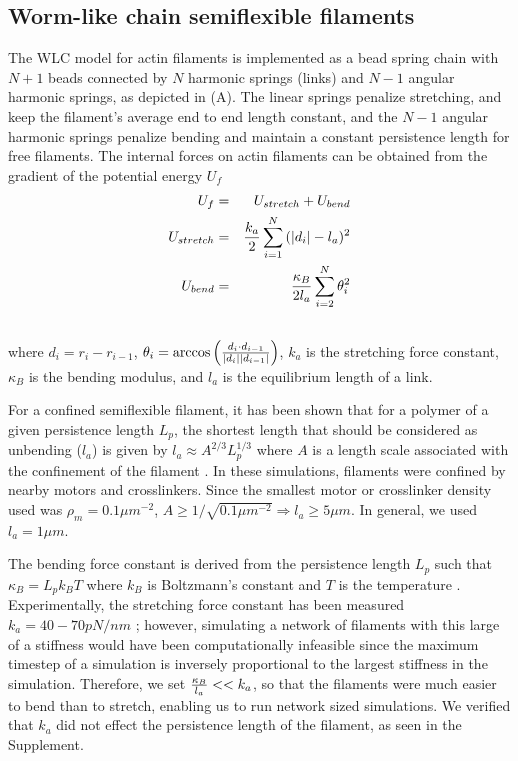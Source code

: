 \documentclass[12pt]{article}
\begin{document}
\subsection{Worm-like chain semiflexible filaments}
The WLC model for actin filaments is implemented as a bead spring chain with $N+1$ beads connected by $N$ harmonic
springs (links) and $N-1$ angular harmonic springs, as depicted in (A). The linear springs 
penalize stretching, and keep the filament's average end to end length constant, and the $N-1$ angular harmonic springs
penalize bending and maintain a constant persistence length for free filaments. 
The internal forces on actin filaments can be obtained from the gradient of the potential energy $U_f$
\begin{eqnarray}
  U_f &=& U_{stretch} + U_{bend}\\
  U_{stretch}&=&{k_a\over2}\sum_{i=1}^{N}{(|d_i| - l_a)^2}\\\nonumber
  U_{bend}&=&{\kappa_B\over 2l_a}\sum_{i=2}^N{\theta_i^2}\\\nonumber
  \label{eqn:Ufil}
\end{eqnarray}
where $d_i = r_i-r_{i-1}$, $\theta_i = \arccos{\left({d_i\cdot d_{i-1}\over |d_i||d_{i-1}|}\right)}$, $k_a$ is the
stretching force constant, $\kappa_B$ is the bending modulus, and $l_a$ is the equilibrium length of a
link. 
\par
For a confined semiflexible filament, it has been shown that for a polymer of a
given persistence length $L_p$, the shortest length that should be considered as
unbending ($l_a$) is given by $l_a\approx A^{2/3}L_p^{1/3}$ where $A$ is a
length scale associated with the confinement of the
filament \cite{odijk1983}. In these simulations, filaments were confined by
nearby motors and crosslinkers. Since the smallest motor or crosslinker density
used was $\rho_m=0.1\mu m^{-2}$, $A\ge1/\sqrt{0.1\mu m^{-2}}\Rightarrow l_a\ge5\mu m$.
In general, we used $l_a=1\mu m$. 
\par
The bending force constant is derived from the persistence length $L_p$ such that
$\kappa_B = L_p k_B T$ where $k_B$ is Boltzmann's constant and $T$ is the temperature \cite{rubinstein}.
Experimentally, the stretching force constant has been measured $k_a=40-70pN/nm$ \cite{kojima1994, higuchi1995};
however, simulating a network of filaments with this large of a stiffness would
have been computationally infeasible since the maximum timestep of a simulation is inversely
proportional to the largest stiffness in the simulation. Therefore, we set ${\kappa_B\over l_a} <<k_a$, so that the filaments
were much easier to bend than to stretch, enabling us to run network sized 
simulations. We verified that $k_a$ did not effect the persistence length of the
filament, as seen in the Supplement.
\end{document}
